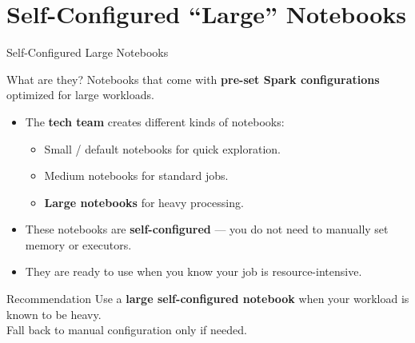 \documentclass[aspectratio=169]{beamer}
\begin{document}
	\section{Self-Configured ``Large'' Notebooks}
	
	\begin{frame}{Self-Configured Large Notebooks}
		\begin{block}{What are they?}
			Notebooks that come with \textbf{pre-set Spark configurations} optimized for large workloads.
		\end{block}
		
		\begin{itemize}
			\item The \textbf{tech team} creates different kinds of notebooks:
			\begin{itemize}
				\item Small / default notebooks for quick exploration.
				\item Medium notebooks for standard jobs.
				\item \textbf{Large notebooks} for heavy processing.
			\end{itemize}
			\item These notebooks are \textbf{self-configured} --- you do not need to manually set memory or executors.
			\item They are ready to use when you know your job is resource-intensive.
		\end{itemize}
		
		\begin{exampleblock}{Recommendation}
			Use a \textbf{large self-configured notebook} when your workload is known to be heavy.\\
			Fall back to manual configuration only if needed.
		\end{exampleblock}
	\end{frame}
	
\end{document}
